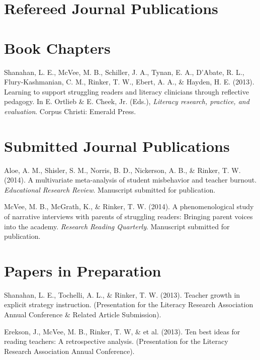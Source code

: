 \section{Refereed Journal Publications}
\vspace{-.1275in}
\begin{bibsection}
    \item
\end{bibsection}
\halfblankline

\section{Book Chapters}
\vspace{-.1275in}
\begin{bibsection}
    \item Shanahan, L. E., McVee, M. B., Schiller, J. A., Tynan, E. A., D'Abate, R. L., Flury-Kashmanian, C. M., Rinker, T. W., Ebert, A. A., \& Hayden, H. E. (2013). Learning to support struggling readers and literacy clinicians through reflective pedagogy. In E. Ortlieb \& E. Cheek, Jr. (Eds.), \emph{Literacy research, practice, and evaluation}. Corpus Christi: Emerald Press.
\end{bibsection}

\section{Submitted Journal Publications}
\vspace{-.1275in}
\begin{bibsection}
    \item Aloe, A. M., Shisler, S. M., Norris, B. D., Nickerson, A. B., \& Rinker, T. W. (2014). A multivariate meta-analysis of student misbehavior and teacher burnout. \emph{Educational Research Review}. Manuscript submitted for publication.
    \item McVee, M. B., McGrath, K., \& Rinker, T. W. (2014). A phenomenological study of narrative interviews with parents of struggling readers: Bringing parent voices into the academy. \emph{Research Reading Quarterly}. Manuscript submitted for publication.
\end{bibsection}


\halfblankline

\section{Papers in Preparation}
\vspace{-.1in}
\begin{bibsection}
    \item Shanahan, L. E., Tochelli, A. L., \& Rinker, T. W. (2013). Teacher growth in explicit strategy
instruction. (Presentation for the Literacy Research Association Annual Conference \& Related Article Submission).
    \item Erekson, J., McVee, M. B., Rinker, T. W, \& et al. (2013). Ten best ideas for reading teachers: A retrospective analysis. (Presentation for the Literacy Research Association Annual Conference).

\end{bibsection}

